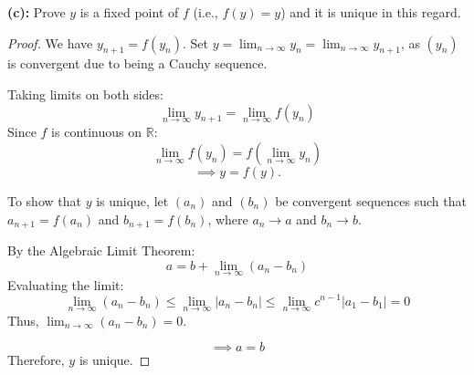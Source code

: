 \documentclass{article}
\begin{document}
\bigskip

\noindent\textbf{(c):} Prove $y$ is a fixed point of $f$ (i.e., $f(y) = y$) and it is unique in this regard.

\begin{proof}
We have $y_{n+1} = f(y_n)$. Set $y = \lim_{n \to \infty} y_n = \lim_{n \to \infty} y_{n+1}$, as $(y_n)$ is convergent due to being a Cauchy sequence.

Taking limits on both sides:
\[
\lim_{n \to \infty} y_{n+1} = \lim_{n \to \infty} f(y_n)
\]
Since $f$ is continuous on $\mathbb{R}$:
\[
\lim_{n \to \infty} f(y_n) = f\left(\lim_{n \to \infty} y_n\right)
\]
\[
\implies y = f(y).
\]

\vspace{0.5em}

To show that $y$ is unique, let $(a_n)$ and $(b_n)$ be convergent sequences such that $a_{n+1} = f(a_n)$ and $b_{n+1} = f(b_n)$, where $a_n \to a$ and $b_n \to b$.

By the Algebraic Limit Theorem:
\[
a = b + \lim_{n \to \infty} (a_n - b_n)
\]
Evaluating the limit:
\[
\lim_{n \to \infty} (a_n - b_n) \le \lim_{n \to \infty} |a_n - b_n| \le \lim_{n \to \infty} c^{n-1} |a_1 - b_1| = 0
\]
Thus, $\lim_{n \to \infty} (a_n - b_n) = 0$.

\[
\implies a = b
\]
Therefore, $y$ is unique.
\end{proof}
\end{document}
